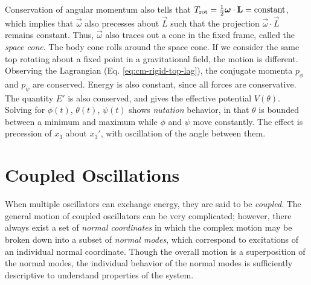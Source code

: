 Conservation of angular momentum also tells that $T_{\text{rot}} = \frac{1}{2}\boldsymbol{\mathbf{\omega}}\cdot\boldsymbol{\mathbf{L}}=\text{constant}$, which implies that $\vec{\omega}$ also precesses about $\vec{L}$ such that the projection $\vec{\omega}\cdot\vec{L}$ remains constant. Thus, $\vec{\omega}$ also traces out a cone in the fixed frame, called the \textit{space cone}. The body cone rolls around the space cone.
If we consider the same top rotating about a fixed point in a gravitational field, the motion is different. Observing the Lagrangian (Eq. \ref{eq:cm-rigid-top-lag}), the conjugate momenta $p_{\phi}$ and $p_{\psi}$ are conserved. Energy is also constant, since all forces are conservative. The quantity $E'$ is also conserved, and gives the effective potential $V(\theta)$. Solving for $\phi(t)$, $\theta(t)$, $\psi(t)$ shows \textit{nutation} behavior, in that $\theta$ is bounded between a minimum and maximum while $\phi$ and $\psi$ move constantly. The effect is precession of $x_3$ about $x_3'$, with oscillation of the angle between them.




\newpage
\section{Coupled Oscillations}
\label{sec:cm-coupled}
When multiple oscillators can exchange energy, they are said to be \textit{coupled}. The general motion of coupled oscillators can be very complicated; however, there always exist a set of \textit{normal coordinates} in which the complex motion may be broken down into a subset of \textit{normal modes}, which correspond to excitations of an individual normal coordinate. Though the overall motion is a superposition of the normal modes, the individual behavior of the normal modes is sufficiently descriptive to understand properties of the system. 

